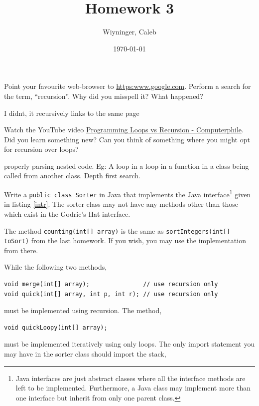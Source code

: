 \documentclass{homework}
\author{Wiyninger, Caleb}
\date{\today}
\title{Homework 3}
\newcommand\computerphile{\href{%
    https://www.youtube.com/watch?v=HXNhEYqFo0o%
  }{Programming Loops vs Recursion - Computerphile}}
\begin{document}
 \maketitle

\question Point your favourite web-browser to \url{https:www.google.com}.
Perform a search for the term, ``recursion''. Why did you misspell
it? What happened?

\begin{sol}
I didnt, it recursively links to the same page 
\end{sol}

\question\label{vid} Watch the YouTube video \computerphile. Did you
learn something new? Can you think of something where you might opt
for recursion over loops?

\begin{sol}
  properly parsing nested code. Eg: A loop in a loop in a function in a class being called from another class. Depth first search. 
\end{sol}

\question Write a \texttt{public class Sorter} in Java that implements the
Java interface\footnote{Java interfaces are just abstract classes
  where all the interface methods are left to be implemented.
  Furthermore, a Java class may implement more than one interface
  but inherit from only one parent class.} given in listing
\ref{intr}. The sorter class may not have any methods other than
those which exist in the Godric's Hat interface.

% 

The method \texttt{counting(int[] array)} is the same as
\texttt{sortIntegers(int[] toSort)} from the last homework. If you
wish, you may use the implementation from there.

While the following two methods,

\begin{verbatim}
void merge(int[] array);               // use recursion only
void quick(int[] array, int p, int r); // use recursion only
\end{verbatim}

must be implemented using recursion. The method,

\begin{verbatim}
void quickLoopy(int[] array);
\end{verbatim}

must be implemented iteratively \ie using only loops. The only
import statement you may have in the sorter class should import
the stack,
\end{document}
